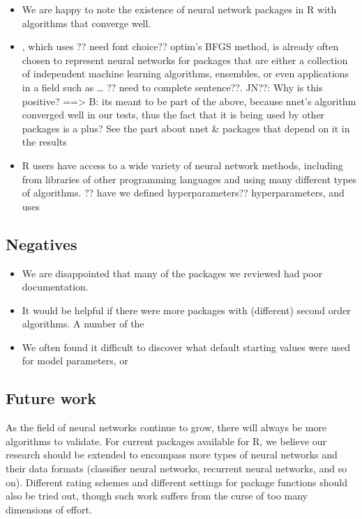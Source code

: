 \begin{itemize}
\tightlist
\item
  We are happy to note the existence of neural network packages in R
  with algorithms that converge well.
\item
  , which uses ?? need font choice?? optim's BFGS method, is
  already often chosen to represent neural networks for packages that
  are either a collection of independent machine learning algorithms,
  ensembles, or even applications in a field such as \ldots{} ?? need to
  complete sentence??. JN??: Why is this positive? ==\textgreater{} B:
  its meant to be part of the above, because nnet's algorithm converged
  well in our tests, thus the fact that it is being used by other
  packages is a plus? See the part about nnet \& packages that depend on
  it in the results
\item
  R users have access to a wide variety of neural network methods,
  including from libraries of other programming languages and using many
  different types of algorithms. ?? have we defined hyperparameters??
  hyperparameters, and uses 
\end{itemize}

\hypertarget{negatives}{%
\subsection{Negatives}\label{negatives}}

\begin{itemize}
\tightlist
\item
  We are disappointed that many of the packages we reviewed had poor
  documentation.
\item
  It would be helpful if there were more packages with (different)
  second order algorithms. A number of the 
\item
  We often found it difficult to discover what default starting values
  were used for model parameters, or 
\end{itemize}

\hypertarget{future-work}{%
\subsection{Future work}\label{future-work}}

As the field of neural networks continue to grow, there will always be
more algorithms to validate. For current packages available for R, we
believe our research should be extended to encompass more types of
neural networks and their data formats (classifier neural networks,
recurrent neural networks, and so on). Different rating schemes and
different settings for package functions should also be tried out,
though such work suffers from the curse of too many dimensions of
effort.

